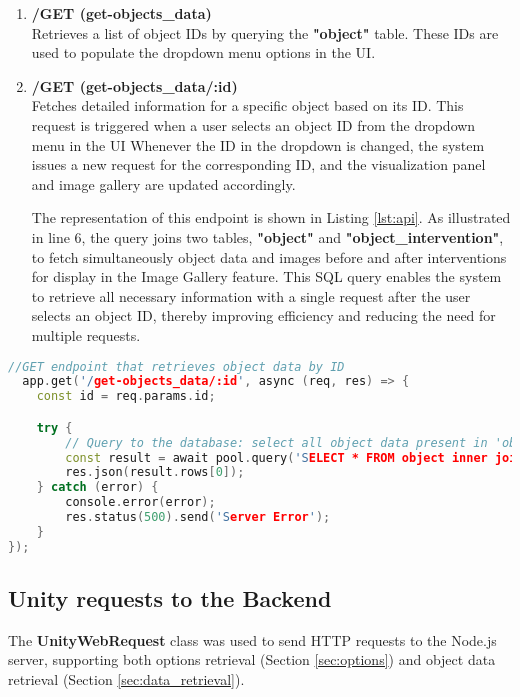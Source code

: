 \begin{enumerate}
  \item \textbf{/GET (get-objects\_data)}
  \\Retrieves a list of object IDs by querying the \textbf{"object"} table. These IDs are used to populate the dropdown menu options in the \gls{UI}.

  \item \textbf{/GET (get-objects\_data/:id)}
  \\Fetches detailed information for a specific object based on its ID. This request is triggered when a user selects an object ID from the dropdown menu in the \gls{UI}
  Whenever the ID in the dropdown is changed, the system issues a new request for the corresponding ID, and the visualization panel and image gallery are updated accordingly.

    The representation of this endpoint is shown in Listing \ref{lst:api}. As illustrated in line 6, the query joins two tables, \textbf{"object"} and \textbf{"object\_intervention"}, to fetch simultaneously object data and images before and after interventions for display in the Image Gallery feature. 
    This SQL query enables the system to retrieve all necessary information with a single request after the user selects an object ID, thereby improving efficiency and reducing the need for multiple requests.

\end{enumerate}

\begin{lstlisting}[language=C++, caption={Example of defining an \gls{API} endpoint in Node.js.},label={lst:api},float]
  //GET endpoint that retrieves object data by ID
  app.get('/get-objects_data/:id', async (req, res) => {
    const id = req.params.id;

    try {
        // Query to the database: select all object data present in 'object' and 'object_intervention' tables by ID
        const result = await pool.query('SELECT * FROM object inner join object_intervention on object.id = object_intervention.object_id WHERE object.id = $1', [id]);
        res.json(result.rows[0]);
    } catch (error) {
        console.error(error);
        res.status(500).send('Server Error');
    }
});
\end{lstlisting}

\subsection{Unity requests to the Backend}
The \textbf{UnityWebRequest} class was used to send HTTP requests to the Node.js server, supporting both options retrieval (Section \ref{sec:options}) and object data retrieval (Section \ref{sec:data_retrieval}).

